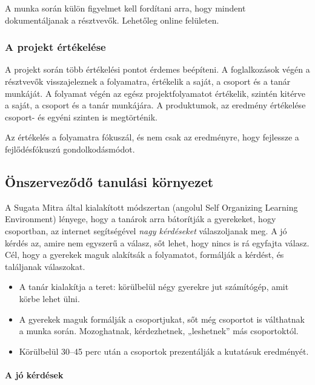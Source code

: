 A munka során külön figyelmet kell fordítani arra, hogy mindent
dokumentáljanak a résztvevők. Lehetőleg online felületen.

\hypertarget{a-projekt-ertekelese}{%
\subsubsection{A projekt értékelése}\label{a-projekt-ertekelese}}

A projekt során több értékelési pontot érdemes beépíteni. A
foglalkozások végén a résztvevők visszajeleznek a folyamatra, értékelik
a saját, a csoport és a tanár munkáját. A folyamat végén az egész
projektfolyamatot értékelik, szintén kitérve a saját, a csoport és a
tanár munkájára. A produktumok, az eredmény értékelése csoport- és
egyéni szinten is megtörténik.

Az értékelés a folyamatra fókuszál, és nem csak az eredményre, hogy
fejlessze a fejlődésfókuszú gondolkodásmódot.

\hypertarget{onszervezodo-tanulasi-kornyezet}{%
\subsection{Önszerveződő tanulási
környezet}\label{onszervezodo-tanulasi-kornyezet}}

A Sugata Mitra által kialakított módszertan (angolul Self Organizing
Learning Environment) lényege, hogy a tanárok arra bátorítják a
gyerekeket, hogy csoportban, az internet segítségével \emph{nagy
kérdéseket} válaszoljanak meg. A jó kérdés az, amire nem egyszerű a
válasz, sőt lehet, hogy nincs is rá egyfajta válasz. Cél, hogy a
gyerekek maguk alakítsák a folyamatot, formálják a kérdést, és
találjanak válaszokat.

\begin{itemize}
\tightlist
\item
  A tanár kialakítja a teret: körülbelül négy gyerekre jut számítógép,
  amit körbe lehet ülni.
\item
  A gyerekek maguk formálják a csoportjukat, sőt még csoportot is
  válthatnak a munka során. Mozoghatnak, kérdezhetnek, „leshetnek'' más
  csoportoktól.
\item
  Körülbelül 30--45 perc után a csoportok prezentálják a kutatásuk
  eredményét.
\end{itemize}

\hypertarget{a-jo-kerdesek}{%
\paragraph{A jó kérdések}\label{a-jo-kerdesek}}

